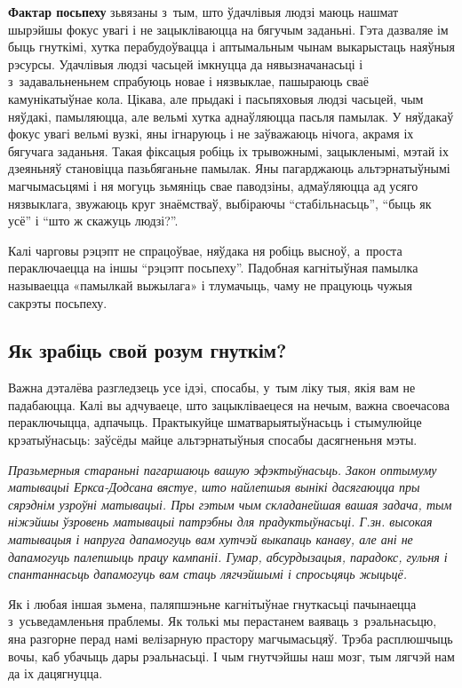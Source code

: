 \textbf{Фактар посьпеху} зьвязаны з~тым, што ўдачлівыя людзі маюць нашмат шырэйшы фокус увагі і не зацыкліваюцца на бягучым заданьні. Гэта дазваляе ім быць гнуткімі, хутка перабудоўвацца і аптымальным чынам выкарыстаць наяўныя рэсурсы. Удачлівыя людзі часьцей імкнуцца да нявызначанасьці і з~задавальненьнем спрабуюць новае і нязвыклае, пашыраюць сваё камунікатыўнае кола. Цікава, але прыдакі і пасьпяховыя людзі часьцей, чым няўдакі, памыляюцца, але вельмі хутка аднаўляюцца пасьля памылак. У няўдакаў фокус увагі вельмі вузкі, яны ігнаруюць і не заўважаюць нічога, акрамя іх бягучага заданьня. Такая фіксацыя робіць іх трывожнымі, зацыкленымі, мэтай іх дзеяньняў становіцца пазьбяганьне памылак. Яны пагарджаюць альтэрнатыўнымі магчымасьцямі і ня могуць зьмяніць свае паводзіны, адмаўляюцца ад усяго нязвыклага, звужаюць круг знаёмстваў, выбіраючы ``стабільнасьць'', ``быць як усё'' і ``што ж скажуць людзі?''. 


Калі чарговы рэцэпт не спрацоўвае, няўдака ня робіць высноў, а~проста пераключаецца на іншы ``рэцэпт посьпеху''. Падобная кагнітыўная памылка называецца «памылкай выжылага» і тлумачыць, чаму не працуюць чужыя сакрэты посьпеху. 

\subsection*{Як зрабіць свой розум гнуткім?}

Важна дэталёва разгледзець усе ідэі, спосабы, у~тым ліку тыя, якія вам не падабаюцца. Калі вы адчуваеце, што зацыкліваецеся на нечым, важна своечасова пераключыцца, адпачыць. Практыкуйце шматварыятыўнасьць і стымулюйце крэатыўнасьць: заўсёды майце альтэрнатыўныя спосабы дасягненьня мэты. 

\emph{Празьмерныя стараньні пагаршаюць вашую эфэктыўнасьць. Закон оптымуму матывацыі Еркса-Додсана вястуе, што найлепшыя вынікі дасягаюцца пры сярэднім узроўні матывацыі. Пры гэтым чым складанейшая вашая задача, тым ніжэйшы ўзровень матывацыі патрэбны для прадуктыўнасьці. Г.зн. высокая матывацыя і напруга дапамогуць вам хутчэй выкапаць канаву, але ані не дапамогуць палепшыць працу кампаніі. Гумар, абсурдызацыя, парадокс, гульня і спантаннасьць дапамогуць вам стаць лягчэйшымі і спросьцяць жыцьцё.}

Як і любая іншая зьмена, паляпшэньне кагнітыўнае гнуткасьці пачынаецца з~усьведамленьня праблемы. Як толькі мы перастанем ваяваць з~рэальнасьцю, яна разгорне перад намі велізарную прастору магчымасьцяў. Трэба расплюшчыць вочы, каб убачыць дары рэальнасьці. І чым гнутчэйшы наш мозг, тым лягчэй нам да іх дацягнуцца.

